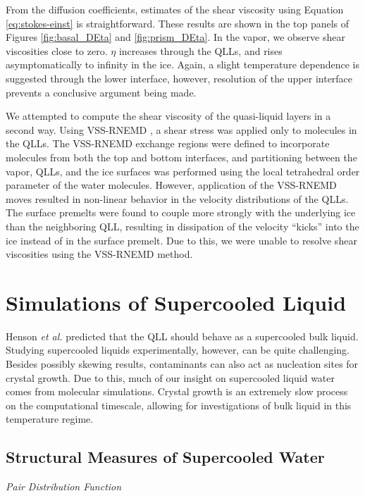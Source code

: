 From the diffusion coefficients, estimates of the shear viscosity
using Equation \eqref{eq:stokes-einst} is straightforward. These
results are shown in the top panels of Figures \ref{fig:basal_DEta}
and \ref{fig:prism_DEta}. In the vapor, we observe shear viscosities
close to zero.  $\eta$ increases through the QLLs, and rises
asymptomatically to infinity in the ice. Again, a slight
temperature dependence is suggested through the lower interface,
however, resolution of the upper interface prevents a conclusive
argument being made. 

We attempted to compute the shear viscosity of the quasi-liquid layers
in a second way. Using VSS-RNEMD \cite{Kuang2012}, a shear stress was
applied only to molecules in the QLLs. The VSS-RNEMD exchange regions
were defined to incorporate molecules from both the top and bottom
interfaces, and partitioning between the vapor, QLLs, and the ice
surfaces was performed using the local tetrahedral order parameter of
the water molecules. However, application of the VSS-RNEMD moves
resulted in non-linear behavior in the velocity distributions of the
QLLs. The surface premelts were found to couple more strongly with the
underlying ice than the neighboring QLL, resulting in dissipation of
the velocity ``kicks'' into the ice instead of in the surface
premelt. Due to this, we were unable to resolve shear viscosities
using the VSS-RNEMD method.



\section{Simulations of Supercooled Liquid}
Henson \textit{et al.} predicted that the QLL should behave as a
supercooled bulk liquid.\cite{Henson2005} Studying supercooled liquids
experimentally, however, can be quite challenging. Besides possibly
skewing results, contaminants can also act as nucleation sites for
crystal growth. Due to this, much of our insight on supercooled liquid
water comes from molecular simulations. Crystal growth is an extremely
slow process on the computational timescale, allowing for
investigations of bulk liquid in this temperature regime. 

\subsection{Structural Measures of Supercooled Water}

\begin{flushleft}
\textit{Pair Distribution Function}
\end{flushleft}

